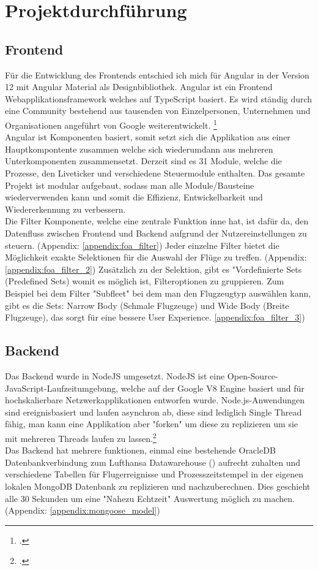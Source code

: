 \section{Projektdurchführung}

	\subsection{Frontend}
	Für die Entwicklung des Frontends entschied ich mich für Angular in der Version 12 mit Angular Material als Designbibliothek. Angular ist ein Frontend Webapplikationsframework welches auf TypeScript basiert. Es wird ständig durch eine Community bestehend aus tausenden von Einzelpersonen, Unternehmen und Organisationen angeführt von Google weiterentwickelt. \footcite{3}\\
	Angular ist Komponenten basiert, somit setzt sich die Applikation aus einer Hauptkompontente zusammen welche sich wiederumdann aus mehreren Unterkomponenten zusammensetzt. Derzeit sind es 31 Module, welche die Prozesse, den Liveticker und verschiedene Steuermodule enthalten. Das gesamte Projekt ist modular aufgebaut, sodass man alle Module/Bausteine wiederverwenden kann und somit die Effizienz, Entwickelbarkeit und Wiedererkennung zu verbessern.\\
	Die Filter Komponente, welche eine zentrale Funktion inne hat, ist dafür da, den Datenfluss zwischen Frontend und Backend aufgrund der Nutzereinstellungen zu steuern. (Appendix: \ref{appendix:foa_filter}) Jeder einzelne Filter bietet die Möglichkeit exakte Selektionen für die Auswahl der Flüge zu treffen. (Appendix: \ref{appendix:foa_filter_2}) Zusätzlich zu der Selektion, gibt es "Vordefinierte Sets (Predefined Sets) womit es möglich ist, Filteroptionen zu gruppieren. Zum Beispiel bei dem Filter "Subfleet" bei dem man den Flugzeugtyp auswählen kann, gibt es die Sets: Narrow Body (Schmale Flugzeuge) und Wide Body (Breite Flugzeuge), das sorgt für eine bessere User Experience. \ref{appendix:foa_filter_3})


	\subsection{Backend}
	Das Backend wurde in NodeJS umgesetzt. NodeJS ist eine Open-Source-JavaScript-Laufzeitumgebung, welche auf der Google V8 Engine basiert und für hochskalierbare Netzwerkapplikationen entworfen wurde. Node.js-Anwendungen sind ereignisbasiert und laufen asynchron ab, diese sind lediglich Single Thread fähig, man kann eine Applikation aber "forken" um diese zu replizieren um sie mit mehreren Threads laufen zu lassen.\footcite{4}\\
	Das Backend hat mehrere funktionen, einmal eine bestehende OracleDB Datenbankverbindung zum Lufthansa Datawarehouse () aufrecht zuhalten und verschiedene Tabellen für Flugerreignisse und Prozesszeitstempel in der eigenen lokalen MongoDB Datenbank zu replizieren und nachzuberechnen. Dies geschieht alle 30 Sekunden um eine "Nahezu Echtzeit" Auswertung möglich zu machen. (Appendix: \ref{appendix:mongoose_model})



